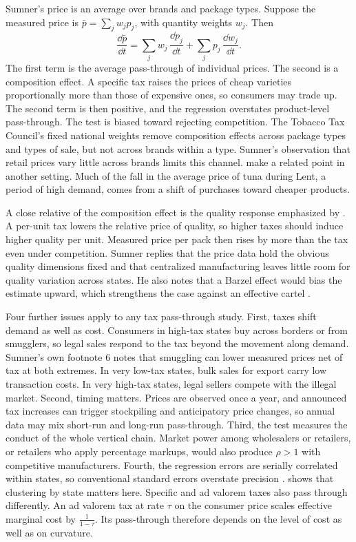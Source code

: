 Sumner's price is an average over brands and package types. Suppose the measured price is $\bar p = \sum_j w_j p_j$,
with quantity weights $w_j$. Then
\begin{equation*}
\frac{\dd \bar p}{\dd t} = \sum_j w_j\,\frac{\dd p_j}{\dd t} + \sum_j p_j\,\frac{\dd w_j}{\dd t}.
\end{equation*}
The first term is the average pass-through of individual prices. The second is a composition effect. A specific tax
raises the prices of cheap varieties proportionally more than those of expensive ones, so consumers may trade up. The
second term is then positive, and the regression overstates product-level pass-through. The test is biased toward
rejecting competition. The Tobacco Tax Council's fixed national weights remove composition effects across package types
and types of sale, but not across brands within a type. Sumner's observation that retail prices vary little across brands limits this
channel. \citet[p.~13]{NevoHatzitaskos2005} make a related point in another
setting. Much of the fall in the average price of tuna during Lent, a period of high demand, comes from a shift of
purchases toward cheaper products.

A close relative of the composition effect is the quality response emphasized by \citet{Barzel1976}. A per-unit tax
lowers the relative price of quality, so higher taxes should induce higher quality per unit. Measured price per pack
then rises by more than the tax even under competition. Sumner replies that the price data hold the obvious quality
dimensions fixed and that centralized manufacturing leaves little room for quality variation across states. He also
notes that a Barzel effect would bias the estimate upward, which strengthens the case against an effective cartel
\citep[p.~1018]{Sumner1981}.

Four further issues apply to any tax pass-through study. First, taxes shift demand as well as cost. Consumers in
high-tax states buy across borders or from smugglers, so legal sales respond to the tax beyond the movement along
demand. Sumner's own footnote 6 notes that smuggling can lower measured prices net of tax at both extremes. In very
low-tax states, bulk sales for export carry low transaction costs. In very high-tax states, legal sellers compete with
the illegal market. Second, timing matters. Prices are observed once a year, and announced tax increases can trigger
stockpiling and anticipatory price changes, so annual data may mix short-run and long-run pass-through. Third, the
test measures the conduct of the whole vertical chain. Market power among wholesalers or retailers, or retailers who
apply percentage markups, would also produce $\rho > 1$ with competitive manufacturers. Fourth, the regression errors
are serially correlated within states, so conventional standard errors overstate precision
\citep{BertrandDufloMullainathan2004}.  shows that clustering by state matters here.
Specific and ad valorem taxes also pass through differently. An ad valorem tax at rate $\tau$ on the consumer price
scales effective marginal cost by $\frac{1}{1 - \tau}$. Its pass-through therefore depends on the level of cost as well
as on curvature.

